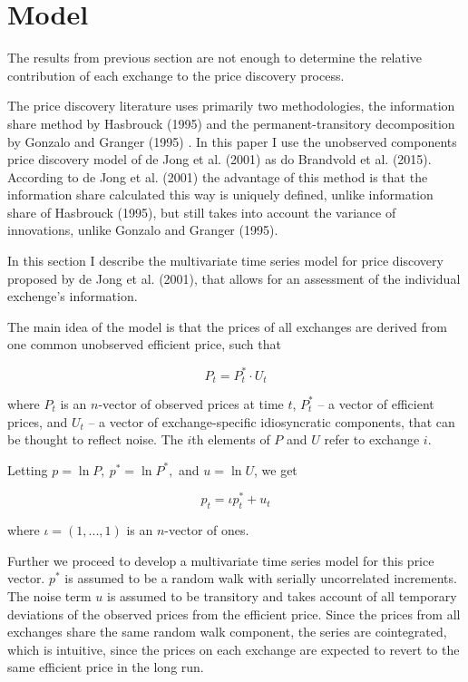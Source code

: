 \documentclass[a4paper,12pt]{article}
\begin{document}
  \newpage

  \section{Model}
    The results from previous section are not enough to determine the relative contribution of each exchange to the price discovery process.

    The price discovery literature uses primarily two methodologies, the information share method by Hasbrouck (1995) \cite{hasbrouck} and the permanent-transitory decomposition by Gonzalo and Granger (1995) \cite{granger}. In this paper I use the unobserved components price discovery model of de Jong et al. (2001) \cite{jong} as do Brandvold et al. (2015). According to de Jong et al. (2001) the advantage of this method is that the information share calculated this way is uniquely defined, unlike information share of Hasbrouck (1995), but still takes into account the variance of innovations, unlike Gonzalo and Granger (1995).

    In this section I describe the multivariate time series model for price discovery proposed by de Jong et al. (2001), that allows for an assessment of the individual exchenge's information.

    The main idea of the model is that the prices of all exchanges are derived from one common unobserved efficient price, such that

    \begin{equation}
      P_t = P^*_t \cdot U_t
    \end{equation}

    where $P_t$ is an  $n$-vector of observed prices at time $t$, $P^*_t$ -- a vector of efficient prices, and $U_t$ -- a vector of exchange-specific idiosyncratic components, that can be thought to reflect noise. The $i$th elements of $P$ and $U$ refer to exchange $i$.

    Letting $p = \ln P, \ p^* = \ln P^*,$ and $u = \ln U$, we get

    \begin{equation}
      p_t = \iota p^*_t + u_t
    \end{equation}

    where $\iota = (1, ..., 1)$ is an $n$-vector of ones.

    Further we proceed to develop a multivariate time series model for this price vector. $p^*$ is assumed to be a random walk with serially uncorrelated increments. The noise term $u$ is assumed to be transitory and takes account of all temporary deviations of the observed prices from the efficient price. Since the prices from all exchanges share the same random walk component, the series are cointegrated, which is intuitive, since the prices on each exchange are expected to revert to the same efficient price in the long run.
\end{document}
